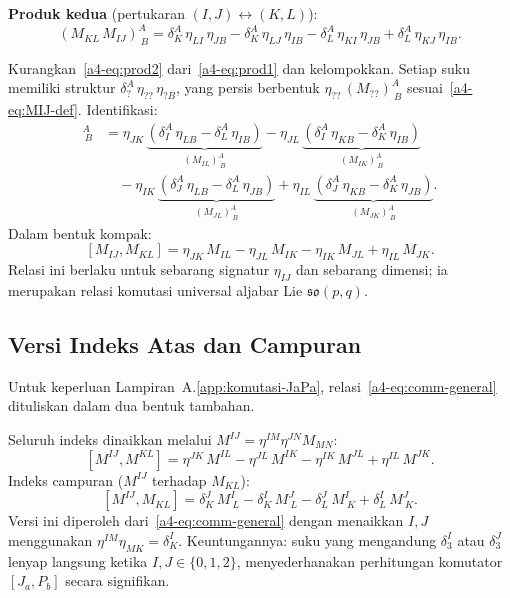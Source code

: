 \noindent \textbf{Produk kedua} (pertukaran $(I,J) \leftrightarrow (K,L)$):
\begin{equation}\label{a4-eq:prod2}
    (M_{KL}\,M_{IJ})^A_{\ B}
    = \delta^A_K\,\eta_{LI}\,\eta_{JB}
    - \delta^A_K\,\eta_{LJ}\,\eta_{IB}
    - \delta^A_L\,\eta_{KI}\,\eta_{JB}
    + \delta^A_L\,\eta_{KJ}\,\eta_{IB}.
\end{equation}

\vspace{0.5em}
Kurangkan~\eqref{a4-eq:prod2} dari~\eqref{a4-eq:prod1} dan kelompokkan. Setiap suku memiliki struktur $\delta^A_?\,\eta_{??}\,\eta_{?B}$, yang persis berbentuk $\eta_{??}\,(M_{??})^A_{\ B}$ sesuai~\eqref{a4-eq:MIJ-def}. Identifikasi:
\begin{align}
    [M_{IJ}, M_{KL}]^A_{\ B} &=
    \eta_{JK}\,\underbrace{(\delta^A_I\,\eta_{LB} - \delta^A_L\,\eta_{IB})}_{(M_{IL})^A_{\ B}}
    - \eta_{JL}\,\underbrace{(\delta^A_I\,\eta_{KB} - \delta^A_K\,\eta_{IB})}_{(M_{IK})^A_{\ B}} \nonumber\\[4pt]
    &\quad - \eta_{IK}\,\underbrace{(\delta^A_J\,\eta_{LB} - \delta^A_L\,\eta_{JB})}_{(M_{JL})^A_{\ B}}
    + \eta_{IL}\,\underbrace{(\delta^A_J\,\eta_{KB} - \delta^A_K\,\eta_{JB})}_{(M_{JK})^A_{\ B}}.
\end{align}
Dalam bentuk kompak:
\begin{equation}\label{a4-eq:comm-general}
    [M_{IJ}, M_{KL}] = \eta_{JK}\,M_{IL} - \eta_{JL}\,M_{IK} - \eta_{IK}\,M_{JL} + \eta_{IL}\,M_{JK}.
\end{equation}
Relasi ini berlaku untuk sebarang signatur $\eta_{IJ}$ dan sebarang dimensi; ia merupakan relasi komutasi universal aljabar Lie $\mathfrak{so}(p,q)$.

\subsection{Versi Indeks Atas dan Campuran}

Untuk keperluan Lampiran~A.\ref{app:komutasi-JaPa}, relasi~\eqref{a4-eq:comm-general} dituliskan dalam dua bentuk tambahan.

Seluruh indeks dinaikkan melalui $M^{IJ} = \eta^{IM}\eta^{JN}M_{MN}$:
\begin{equation}\label{a4-eq:comm-up}
    [M^{IJ}, M^{KL}] = \eta^{JK}\,M^{IL} - \eta^{JL}\,M^{IK} - \eta^{IK}\,M^{JL} + \eta^{IL}\,M^{JK}.
\end{equation}
Indeks campuran ($M^{IJ}$ terhadap $M_{KL}$):
\begin{equation}\label{a4-eq:comm-mixed}
    [M^{IJ}, M_{KL}] = \delta^J_K\,M^I_{\ L} - \delta^I_K\,M^J_{\ L} - \delta^J_L\,M^I_{\ K} + \delta^I_L\,M^J_{\ K}.
\end{equation}
Versi ini diperoleh dari~\eqref{a4-eq:comm-general} dengan menaikkan $I,J$ menggunakan $\eta^{IM}\eta_{MK} = \delta^I_K$. Keuntungannya: suku yang mengandung $\delta^I_3$ atau $\delta^J_3$ lenyap langsung ketika $I,J \in \{0,1,2\}$, menyederhanakan perhitungan komutator $[J_a, P_b]$ secara signifikan.

